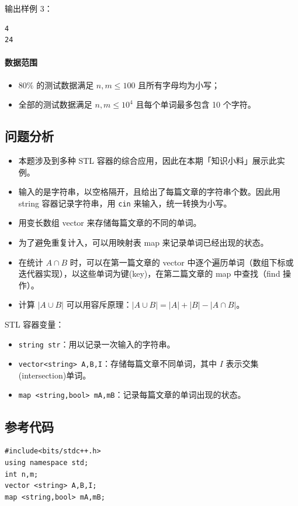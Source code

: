 \documentclass[UTF8]{ctexart}
\newcommand\Emph[1]{\colorbox{green!10}{\textcolor{green!30!black}{#1}}}
\begin{document}
{输出样例 3：
\begin{lstlisting}[numbers=none]
4
24
\end{lstlisting}

\paragraph{数据范围}
\begin{itemize}[itemsep=0pt,parsep=0pt]
    \item $80\%$ 的测试数据满足 $n,m\leqslant 100$ 且所有字母均为小写；
    \item 全部的测试数据满足 $n,m\leqslant 10^4$ 且每个单词最多包含 10 个字符。
\end{itemize}


\subsection{问题分析}
\begin{itemize}
    \item 本题涉及到多种 STL 容器的综合应用，因此在本期「知识小料」展示此实例。
    \item 输入的是字符串，以空格隔开，且给出了每篇文章的字符串个数。因此用 \Emph{string} 容器记录字符串，用 \verb!cin! 来输入，统一转换为小写。
    \item 用变长数组 \Emph{vector} 来存储每篇文章的不同的单词。
    \item 为了避免重复计入，可以用映射表 \Emph{map} 来记录单词已经出现的状态。
    \item 在统计 $A\cap B$ 时，可以在第一篇文章的 vector 中逐个遍历单词（数组下标或迭代器实现），以这些单词为键(key)，在第二篇文章的 map 中查找（find 操作）。
    \item 计算 $|A\cup B|$ 可以用容斥原理：$|A\cup B| = |A| + |B| - |A\cap B|$。
\end{itemize}

STL 容器变量：
\begin{itemize}
    \item \verb!string str!：用以记录一次输入的字符串。
    \item \verb!vector<string> A,B,I!：存储每篇文章不同单词，其中 $I$ 表示交集(intersection)单词。
    \item \verb!map <string,bool> mA,mB!：记录每篇文章的单词出现的状态。
\end{itemize}

\subsection{参考代码}
\begin{lstlisting}
#include<bits/stdc++.h>
using namespace std;
int n,m;
vector <string> A,B,I;
map <string,bool> mA,mB;


\end{lstlisting}}
\end{document}
